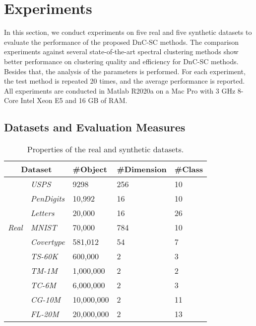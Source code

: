 \documentclass[a4paper,fleqn]{cas-dc}
\begin{document}
\section{Experiments}
\label{sec:experiment}

In this section, we conduct experiments on five real and five synthetic datasets to evaluate the performance of the proposed DnC-SC methods.
The comparison experiments against several state-of-the-art spectral clustering methods show better performance on clustering quality and efficiency for DnC-SC methods.
Besides that, the analysis of the parameters is performed.
For each experiment, the test method is repeated 20 times, and the average performance is reported.
All experiments are conducted in Matlab R2020a on a Mac Pro with 3 GHz 8-Core Intel Xeon E5 and 16 GB of RAM.

\subsection{Datasets and Evaluation Measures}

\begin{table}[!t]
  \centering
  \caption{Properties of the real and synthetic datasets.}
  \label{table:datasets}
  \begin{center}
    \begin{tabular}{p{1.2cm}<{\centering}|p{1.3cm}<{\centering}|p{1.5cm}<{\centering}p{1.2cm}<{\centering}p{1.2cm}<{\centering}}
      \toprule
      \multicolumn{2}{c|}{Dataset}         &\#Object     &\#Dimension      &\#Class\\
      \midrule
                                        & \emph{USPS}      & 9298    & 256 & 10 \\
      \multirow{5}{*}{\emph{Real}}      & \emph{PenDigits} & 10,992    & 16  & 10 \\
                                        & \emph{Letters}   & 20,000    & 16  & 26 \\
                                        & \emph{MNIST}     & 70,000    & 784 & 10 \\
                                        & \emph{Covertype} & 581,012   & 54  & 7  \\
      \midrule
      \multirow{5}{*}{\emph{Synthetic}} & \emph{TS-60K}    & 600,000   & 2   & 3  \\
                                        & \emph{TM-1M}     & 1,000,000 & 2   & 2  \\
                                        & \emph{TC-6M}     & 6,000,000 & 2   & 3  \\
                                        & \emph{CG-10M}    & 10,000,000 & 2   & 11  \\
                                        & \emph{FL-20M}    & 20,000,000 & 2   & 13  \\
      \bottomrule
    \end{tabular}
  \end{center}
\end{table}
\end{document}
